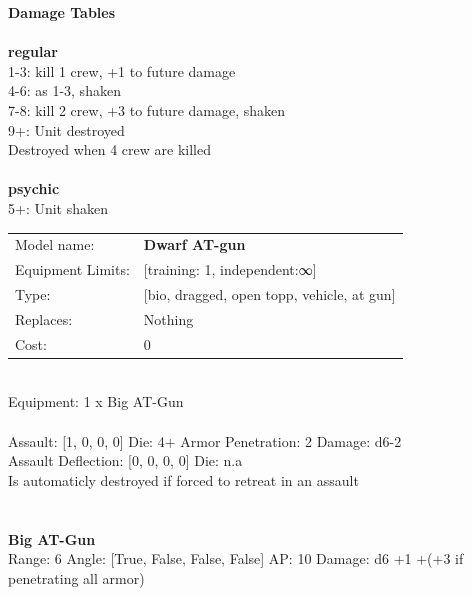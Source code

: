{\bf Damage Tables} \\
\ \\ {\bf regular } \\
1-3: kill 1 crew, +1 to future damage \\
4-6: as 1-3, shaken \\
7-8: kill 2 crew, +3 to future damage, shaken \\
9+: Unit destroyed \\
Destroyed when 4 crew are killed \\
\ \\ {\bf psychic } \\
5+: Unit shaken \\


\noindent
\begin{tabular}{ll}
Model name: &{\bf Dwarf AT-gun } \\
Equipment Limits: &[training: 1, independent:∞] \\
Type: &[bio, dragged, open topp, vehicle, at gun] \\
Replaces: &Nothing \\
Cost: & 0\\
\end{tabular}
\ \\
Equipment: 1 x Big AT-Gun \\
\ \\
Assault: [1, 0, 0, 0] Die: 4+ Armor Penetration: 2 Damage: d6-2 \\
Assault Deflection: [0, 0, 0, 0] Die: n.a\\
\indent Is automaticly destroyed if forced to retreat in an assault\\ 
 
\ \\

\ \\
{\bf Big AT-Gun } \\



Range: 6  Angle: [True, False, False, False] AP: 10 Damage: d6 +1 +(+3 if penetrating all armor) \\




 
\ \\













